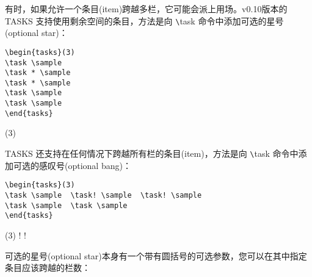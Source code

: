 \documentclass[a4paper,12pt,indent]{article}
\begin{document}
有时，如果允许一个条目(item)跨越多栏，它可能会派上用场。v0.10版本的 \textcolor{Tasks}{TASKS} 支持使用剩余空间的条目，方法是向 \verb|\|\textcolor{Tasks}{task} 命令中添加可选的星号(optional star)：


\begin{tcolorbox}[collower=black,colframe=Tasks,colback=white]
    \begin{lstlisting}
\begin{tasks}(3)
\task \sample
\task * \sample
\task * \sample
\task \sample
\task \sample
\end{tasks}
    \end{lstlisting}
    \tcblower
    \begin{tasks}(3)
        \task \sample
        \task * \sample
        \task * \sample
        \task \sample
        \task \sample
        \end{tasks}
    \end{tcolorbox}

\textcolor{Tasks}{TASKS} 还支持在任何情况下跨越所有栏的条目(item)，方法是向 \verb|\|\textcolor{Tasks}{task} 命令中添加可选的感叹号(optional bang)：


 \begin{tcolorbox}[collower=black,colframe=Tasks,colback=white]
    \begin{lstlisting}
\begin{tasks}(3)
\task \sample  \task! \sample  \task! \sample
\task \sample  \task \sample
\end{tasks}
    \end{lstlisting}
    \end{tcolorbox}

    \begin{tcolorbox}[collower=black,colframe=Tasks,colback=white]
        \tcblower
        \begin{tasks}(3)
            \task \sample
            \task! \sample
            \task! \sample
            \task \sample
            \task \sample
            \end{tasks}
        \end{tcolorbox}

可选的星号(optional star)本身有一个带有圆括号的可选参数，您可以在其中指定条目应该跨越的栏数：
\end{document}
